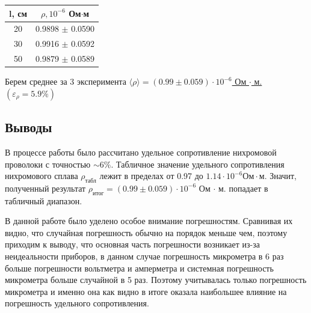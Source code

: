 \documentclass[a4paper]{article}
\begin{document}
\begin{center}
\begin{tabular}{|c|c|}
\hline
l, см & $\rho, 10^{-6}$ Ом$\cdot$м \\ \hline
20    & 0.9898 $\pm$ 0.0590  \\ \hline
30    & 0.9916 $\pm$ 0.0592  \\ \hline
50    & 0.9879 $\pm$ 0.0589  \\ \hline
\end{tabular}
\end{center}

Берем среднее за 3 эксперимента \underline{$\langle \rho \rangle = (0.99 \pm 0.059) \cdot 10^{-6}$ Ом $\cdot$ м. $(\varepsilon_{\rho} = 5.9\%)$}

\subsection{Выводы}
В процессе работы было рассчитано удельное сопротивление нихромовой проволоки с точностью $\sim6\%$. Табличное значение  удельного сопротивления нихромового сплава $\rho_{\text{табл}}$ лежит в пределах от 0.97 до $1.14 \cdot 10^{-6} \text{Ом} \cdot \text{м}$. Значит, полученный результат $ \rho_{\text{итог}} = (0.99 \pm 0.059) \cdot 10^{-6}$ Ом $\cdot$ м. попадает в табличный диапазон.\par
В данной работе было уделено особое внимание погрешностям. Сравнивая их видно, что случайная погрешность обычно на порядок меньше чем, поэтому приходим к выводу, что основная часть погрешности возникает из-за неидеальности приборов, в данном случае погрешность микрометра в 6 раз больше погрешности вольтметра и амперметра и системная погрешность микрометра больше случайной в 5 раз. Поэтому учитывалась только погрешность микрометра и именно она как видно в итоге оказала наибольшее влияние на погрешность удельного сопротивления.
\end{document}
